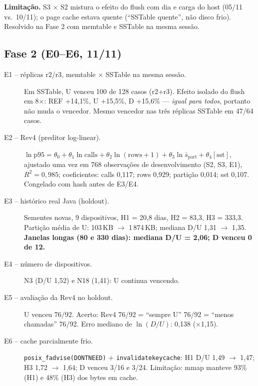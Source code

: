 \documentclass[11pt,a4paper]{article}
\newcommand{\caixa}[2][boxbg]{\par\smallskip\noindent\colorbox{#1}{\parbox{\dimexpr\linewidth-2\fboxsep}{#2}}\par\smallskip}
\newcommand{\limit}[1]{\caixa[warnbg]{\textbf{Limitação.} #1}}
\begin{document}
\limit{S3 $\times$ S2 mistura o efeito do flush com dia e carga do host (05/11 vs.\ 10/11); o page cache estava quente (``SSTable quente'', não disco frio). Resolvido na Fase 2 com memtable e SSTable na mesma sessão.}

\subsection{Fase 2 (E0--E6, 11/11)}
\begin{description}
\item[E1 -- réplicas r2/r3, memtable $\times$ SSTable na mesma sessão.] Em SSTable, U venceu 100 de 128 casos (r2+r3). Efeito isolado do flush em 8$\times$: REF +14,1\%, U +15,5\%, D +15,6\% --- \emph{igual para todos}, portanto não muda o vencedor. Mesmo vencedor nas três réplicas SSTable em 47/64 casos.
\item[E2 -- Rev4 (preditor log-linear).] $\ln \text{p95}=\theta_0+\theta_1\ln\text{calls}+\theta_2\ln(\text{rows}+1)+\theta_3\ln\bar{s}_{\text{part}}+\theta_4[\text{sst}]$, ajustado uma vez em 768 observações de desenvolvimento (S2, S3, E1), $R^2=0{,}985$; coeficientes: calls 0,117; rows 0,929; partição 0,014; sst 0,107. Congelado com hash antes de E3/E4.
\item[E3 -- histórico real Java (holdout).] Sementes novas, 9 dispositivos, H1 = 20,8 dias, H2 = 83,3, H3 = 333,3. Partição média de U: 103\,KB $\to$ 1\,874\,KB; mediana D/U 1,31 $\to$ 1,35. \textbf{Janelas longas (80 e 330 dias): mediana D/U = 2,06; D venceu 0 de 12.}
\item[E4 -- número de dispositivos.] N3 (D/U 1,52) e N18 (1,41): U continua vencendo.
\item[E5 -- avaliação da Rev4 no holdout.] U venceu 76/92. Acerto: Rev4 76/92 = ``sempre U'' 76/92 = ``menos chamadas'' 76/92. Erro mediano de $\ln(D/U)$: 0,138 ($\times$1,15).
\item[E6 -- cache parcialmente frio.] \texttt{posix\_fadvise(DONTNEED)} + \texttt{invalidatekeycache}: H1 D/U 1,49 $\to$ 1,47; H3 1,72 $\to$ 1,64; D venceu 3/16 e 3/24. Limitação: mmap manteve 93\% (H1) e 48\% (H3) dos bytes em cache.
\end{description}
\end{document}
